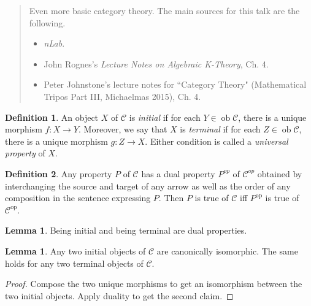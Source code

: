 \documentclass[10pt,letterpaper,cm]{nupset}
\theoremstyle{definition}
\newtheorem{definition}{Definition}
\theoremstyle{theorem}
\newtheorem{lemma}[theorem]{Lemma}
\theoremstyle{remark}
\newcommand{\1}{\mathbf{1}}
\renewcommand{\c}{\mathscr{C}}
\newcommand{\0}{\vec 0}
\DeclareMathOperator{\op}{op}
\DeclareMathOperator{\ob}{ob}
\begin{document}
\begin{abstract}
Even more basic category theory. The main sources for this talk are the following.
\begin{itemize}
\item \textit{nLab}.
\item John Rognes's \textit{Lecture Notes on Algebraic K-Theory}, Ch. 4.
\item Peter Johnstone's lecture notes for ``Category Theory" (Mathematical Tripos Part III, Michaelmas 2015), Ch. 4.
\end{itemize}
\end{abstract}

\begin{definition}
An object $X$ of $\c$ is \textit{initial} if for each $Y \in \ob \c$, there is a unique morphism $f : X \to Y$. Moreover, we say that $X$ is \textit{terminal} if for each $Z \in \ob \c$, there is a unique morphism $g : Z \to X$. Either condition is called a \textit{universal property} of $X$.
\end{definition}

\begin{definition}
Any property $P$ of $\c$ has a dual property $P^{op}$ of $\c^{op}$ obtained by interchanging the source and target of any arrow as well as the order of any composition in the sentence expressing $P$. Then $P$ is true of $\c$ iff $P^{\op}$ is true of $\c^{\op}$.
\end{definition}

\begin{lemma}
Being initial and being terminal are dual properties.
\end{lemma}

\begin{lemma}\label{initial}
Any two initial objects of $\c$ are canonically isomorphic. The same holds for any two terminal objects of $\c$.
\end{lemma}
\begin{proof}
Compose the two unique morphisms to get an isomorphism between the two initial objects. Apply duality to get the second claim.
\end{proof}
\end{document}
